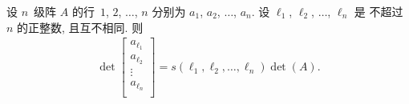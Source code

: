 \documentclass[../libro.tex]{subfiles}
\begin{document}
\begin{theorem}
    设 \(n\)~级阵 \(A\) 的行~\(1\), \(2\), \(\dots\), \(n\)
    分别为 \(a_1\), \(a_2\), \(\dots\), \(a_n\).
    设 \(\ell_1\), \(\ell_2\), \(\dots\), \(\ell_n\) 是%
    不超过 \(n\) 的正整数,
    且互不相同.
    则
    \begin{align*}
        \det {
            \begin{bmatrix}
                a_{\ell_1} \\
                a_{\ell_2} \\
                \vdots     \\
                a_{\ell_n} \\
            \end{bmatrix}
        }
        = s(\ell_1, \ell_2, \dots, \ell_n) \det {(A)}.
    \end{align*}
\end{theorem}
\end{document}
